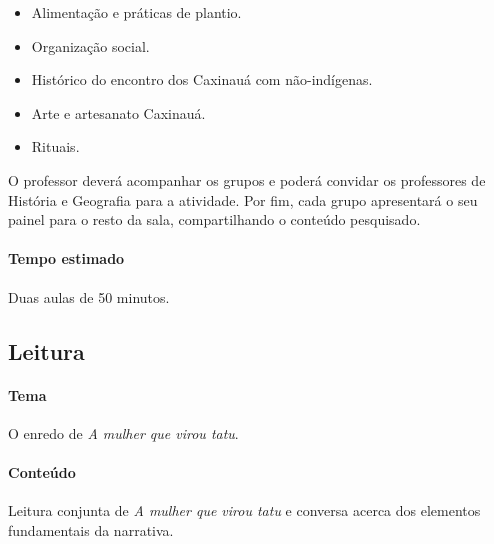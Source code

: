 \documentclass[11pt]{extarticle}
\begin{document}
\begin{itemize}

\item Alimentação e práticas de plantio.

\item Organização social.

\item Histórico do encontro dos Caxinauá com não-indígenas.

\item Arte e artesanato Caxinauá.

\item Rituais.

\end{itemize}


O professor deverá acompanhar os grupos e poderá convidar os professores de História e Geografia para a atividade. Por fim, cada grupo apresentará o seu painel para o resto da sala, compartilhando o conteúdo pesquisado.

\paragraph{Tempo estimado} Duas aulas de 50 minutos.

\subsection{Leitura}


\paragraph{Tema} O enredo de \textit{A mulher que virou tatu}.

\paragraph{Conteúdo} Leitura conjunta de \textit{A mulher que virou tatu} e conversa acerca dos elementos fundamentais da narrativa.
\end{document}
